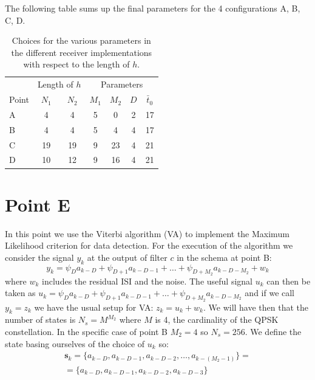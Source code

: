 \documentclass[a4paper,11.5pt]{article}
\newcommand{\vt}{\boldsymbol}
\begin{document}
The following table sums up the final parameters for the 4 configurations A, B, C, D.

\begin{table}[htbp]
	\begin{center}
		\begin{tabular}{p{2.7cm}cccccc}
			\toprule
			& \multicolumn{2}{c}{Length of $h$} & \multicolumn{4}{c}{Parameters} \\
			\cmidrule(lr){2-3}
			\cmidrule(lr){4-7}
			Point & $N_1$ & $N_2$ & $M_1$ & $M_2$ & $D$ & $\bar{t}_0$ \\
			\midrule
			A &  4  &  4  & 5 & 0  & 2 & 17 \\
			B &  4  &  4  & 5 & 4  & 4 & 17 \\
			C & 19  &  19 & 9 & 23 & 4 & 21 \\
			D & 10  &  12 & 9 & 16 & 4 & 21 \\
			\bottomrule
		\end{tabular}
	\end{center}
	\label{tab:sumup}
	\caption{Choices for the various parameters in the different receiver implementations with respect to the length of $h$.}
\end{table} 

\section*{Point E}

In this point we use the Viterbi algorithm (VA) to implement the Maximum Likelihood criterion for data detection. 
For the execution of the algorithm we consider the signal $y_k$ at the output of filter $c$ in the schema at point B:
\begin{equation}
y_k = \psi_D a_{k-D} + \psi_{D+1} a_{k-D-1} + \dots +\psi_{D+M_2} a_{k-D-M_2} + w_k
\end{equation}
where $w_k$ includes the residual ISI and the noise. The useful signal $u_k$ can then be taken as $u_k=\psi_D a_{k-D} + \psi_{D+1} a_{k-D-1} + \dots +\psi_{D+M_2} a_{k-D-M_2}$ and if we call $y_k=z_k$ we have the usual setup for VA: $z_k = u_k+w_k$. We will have then that the number of states is $N_s=M^{M_2}$ where $M$ is 4, the cardinality of the QPSK constellation. In the specific case of point B $M_2=4$ so $N_s=256$. We define the state basing ourselves of the choice of $u_k$ so:
\begin{equation}
\begin{split}
\vt{s}_k = \{a_{k-D}, a_{k-D-1}, a_{k-D-2}, \dots, a_{k-(M_2-1)}\} = \\
= \{a_{k-D}, a_{k-D-1}, a_{k-D-2}, a_{k-D-3}\}
\end{split}
\end{equation}
\end{document}
